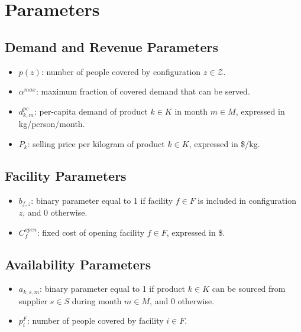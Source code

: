 \documentclass[12pt]{article}
\begin{document}
\newpage

\section{Parameters}

\subsection{Demand and Revenue Parameters}

\begin{itemize}
    \item $p(z)$: number of people covered by configuration $z \in \mathcal{Z}$.
    
    \item $\alpha^{max}$: maximum fraction of covered demand that can be served.
    
    \item $d^{pc}_{k,m}$: per-capita demand of product $k \in K$ in month $m \in M$, expressed in kg/person/month.
    
    \item $P_k$: selling price per kilogram of product $k \in K$, expressed in \$/kg.
\end{itemize}

\subsection{Facility Parameters}

\begin{itemize}
    \item $b_{f,z}$: binary parameter equal to 1 if facility $f \in F$ is included in configuration $z$, and 0 otherwise.
    
    \item $C^{open}_f$: fixed cost of opening facility $f \in F$, expressed in \$.
\end{itemize}

\subsection{Availability Parameters}

\begin{itemize}
    \item $a_{k,s,m}$: binary parameter equal to 1 if product $k \in K$ can be sourced from supplier $s \in S$ during month $m \in M$, and 0 otherwise.
    
    \item $p_i^{F}$: number of people covered by facility $i \in F$.
\end{itemize}
\end{document}
